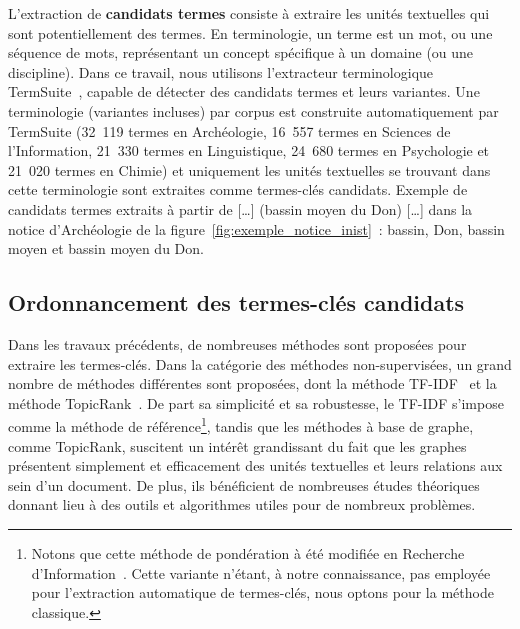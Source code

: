     L'extraction de \textbf{candidats termes} consiste à extraire les unités
    textuelles qui sont potentiellement des termes. En terminologie, un terme
    est un mot, ou une séquence de mots, représentant un concept spécifique à un
    domaine (ou une discipline). Dans ce travail, nous utilisons l'extracteur
    terminologique TermSuite~\cite{rocheteau2011termsuite}, capable de détecter
    des candidats termes et leurs variantes. Une terminologie (variantes
    incluses) par corpus est construite automatiquement par TermSuite (32~119
    termes en Archéologie, 16~557 termes en Sciences de l'Information, 21~330
    termes en Linguistique, 24~680 termes en Psychologie et 21~020 termes en
    Chimie) et uniquement les unités textuelles se trouvant dans cette
    terminologie sont extraites comme termes-clés candidats. Exemple de
    candidats termes extraits à partir de \og{}[\dots] (bassin moyen du Don)
    [\dots]\fg{} dans la notice d'Archéologie de la
    figure~\ref{fig:exemple_notice_inist}~: \og{}bassin\fg{}, \og{}Don\fg{},
    \og{}bassin moyen\fg{} et \og{}bassin moyen du Don\fg{}.
    

  \subsection{Ordonnancement des termes-clés candidats}
  \label{subsec:extraction_de_termes_cles}
    Dans les travaux précédents, de nombreuses méthodes sont proposées pour
    extraire les termes-clés. Dans la catégorie des méthodes non-supervisées, un
    grand nombre de méthodes différentes sont proposées, dont la méthode
    TF-IDF~\cite{jones1972tfidf} et la méthode
    TopicRank~\cite{bougouin2013topicrank}. De part sa simplicité et sa
    robustesse, le TF-IDF s'impose comme la méthode de référence\footnote{Notons
    que cette méthode de pondération à été modifiée en Recherche
    d'Information~\cite[Okapi]{robertson1999okapi,claveau2012vectorisation}.
    Cette variante n'étant, à notre connaissance, pas employée pour l'extraction
    automatique de termes-clés, nous optons pour la méthode classique.}, tandis
    que les méthodes à base de graphe, comme TopicRank, suscitent un intérêt
    grandissant du fait que les graphes présentent simplement et efficacement
    des unités textuelles et leurs relations aux sein d'un document. De plus,
    ils bénéficient de nombreuses études théoriques donnant lieu à des outils et
    algorithmes utiles pour de nombreux problèmes.

